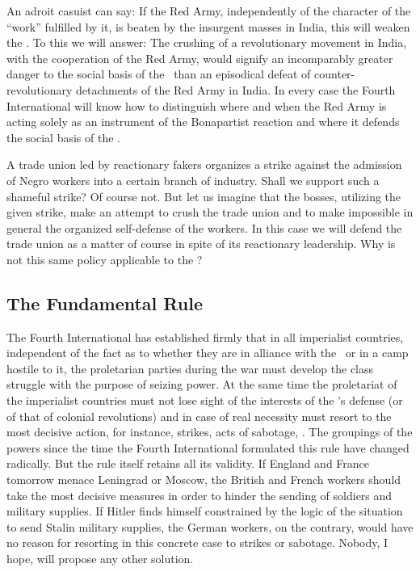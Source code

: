 An adroit casuist can say: If the Red Army, independently of the character of the “work” fulfilled by it, is beaten by the insurgent masses in India, this will weaken the \USSR. To this we will answer: The crushing of a revolutionary movement in India, with the cooperation of the Red Army, would signify an incomparably greater danger to the social basis of the \USSR\ than an episodical defeat of counter-revolutionary detachments of the Red Army in India. In every case the Fourth International will know how to distinguish where and when the Red Army is acting solely as an instrument of the Bonapartist reaction and where it defends the social basis of the \USSR.

A trade union led by reactionary fakers organizes a strike against the admission of Negro workers into a certain branch of industry. Shall we support such a shameful strike? Of course not. But let us imagine that the bosses, utilizing the given strike, make an attempt to crush the trade union and to make impossible in general the organized self-defense of the workers. In this case we will defend the trade union as a matter of course in spite of its reactionary leadership. Why is not this same policy applicable to the \USSR?
\nowidow

\subsection*{The Fundamental Rule}

The Fourth International has established firmly that in all imperialist countries, independent of the fact as to whether they are in alliance with the \USSR\ or in a camp hostile to it, the proletarian parties during the war must develop the class struggle with the purpose of seizing power. At the same time the proletariat of the imperialist countries must not lose sight of the interests of the \USSR’s defense (or of that of colonial revolutions) and in case of real necessity must resort to the most decisive action, for instance, strikes, acts of sabotage, \etc. The groupings of the powers since the time the Fourth International formulated this rule have changed radically. But the rule itself retains all its validity. If England and France tomorrow menace Leningrad or Moscow, the British and French workers should take the most decisive measures in order to hinder the sending of soldiers and military supplies. If Hitler finds himself constrained by the logic of the situation to send Stalin military supplies, the German workers, on the contrary, would have no reason for resorting in this concrete case to strikes or sabotage. Nobody, I hope, will propose any other solution.

